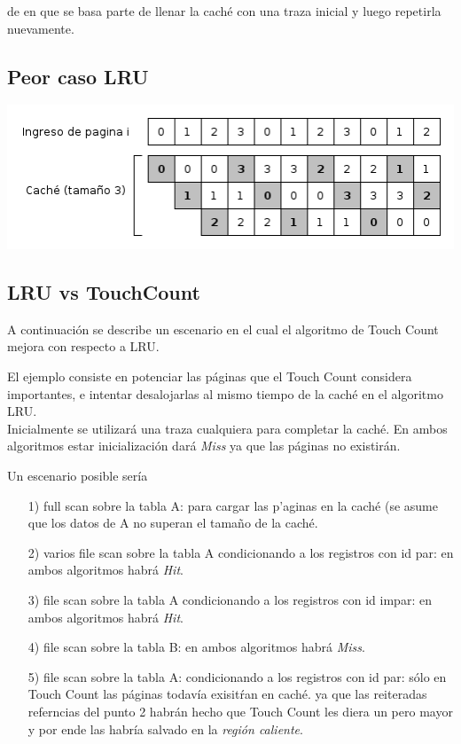 \documentclass[11pt, a4paper, spanish]{article}
\begin{document}
de en que se basa
parte de llenar la cach\'e con una traza inicial y luego repetirla nuevamente.  
	
\subsection{ Peor caso LRU}
	\begin{center}
	\includegraphics[scale=0.65]{diagramas/LRUPathological.png}\\
	\end{center}

\subsection{ LRU vs TouchCount}

A continuaci\'on se describe un escenario en el cual el algoritmo de Touch Count mejora con respecto a LRU.

El ejemplo consiste en potenciar las p\'aginas que el Touch Count considera importantes, e intentar desalojarlas al mismo tiempo de la cach\'e en el
algoritmo LRU.\\

Inicialmente se utilizar\'a una traza cualquiera para completar la cach\'e. En ambos algoritmos estar inicializaci\'on dar\'a \textit{Miss} ya que
las p\'aginas no existir\'an.

Un escenario posible ser\'ia

\begin{itemize}
	\item[1)] full scan sobre la tabla A: para cargar las p'aginas en la cach\'e (se asume que los datos de A no superan el tama\~{n}o de la cach\'e.
	\item[2)] varios file scan sobre la tabla A condicionando a los registros con id par: en ambos algoritmos habr\'a \textit{Hit}.
	\item[3)] file scan sobre la tabla A condicionando a los registros con id impar: en ambos algoritmos habr\'a \textit{Hit}.
	\item[4)] file scan sobre la tabla B: en ambos algoritmos habr\'a \textit{Miss}.
	\item[5)] file scan sobre la tabla A: condicionando a los registros con id par: s\'olo en Touch Count las p\'aginas todav\'ia exisit\'ran en cach\'e.
ya que las reiteradas referncias del punto 2 habr\'an hecho que Touch Count les diera un pero mayor y por ende las habr\'ia salvado en la \textit{regi\'on caliente}.
\end{itemize}
\end{document}
